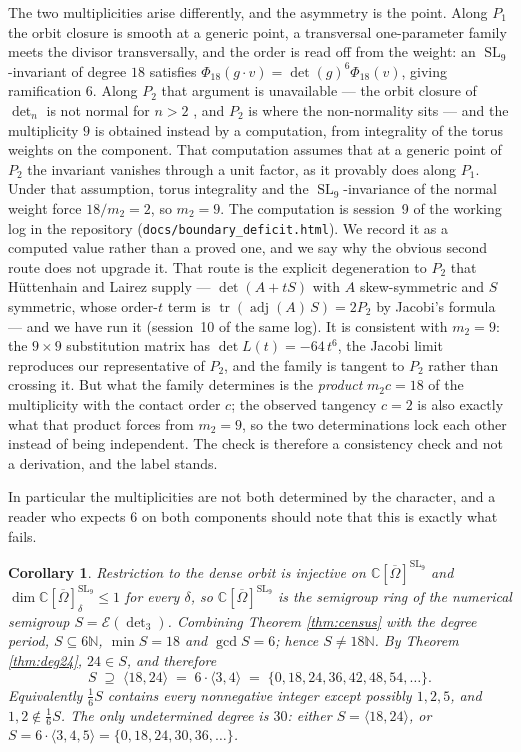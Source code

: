 \documentclass[11pt,reqno]{amsart}
\theoremstyle{plain}
\newtheorem{corollary}[theorem]{Corollary}
\theoremstyle{definition}
\DeclareMathOperator{\SL}{SL}
\DeclareMathOperator{\tr}{tr}
\newcommand{\cO}{\overline{\Omega}}
\newcommand{\bC}{\mathbb{C}}
\newcommand{\bN}{\mathbb{N}}
\begin{document}
The two multiplicities arise differently, and the asymmetry is the point.  Along
$P_1$ the orbit closure is smooth at a generic point, a transversal
one-parameter family meets the divisor transversally, and the order is read off
from the weight: an $\SL_9$-invariant of degree $18$ satisfies
$\Phi_{18}(g\cdot v)=\det(g)^{6}\Phi_{18}(v)$, giving ramification $6$.
Along $P_2$ that argument is unavailable --- the orbit closure of $\det_n$ is
not normal for $n>2$ \cite{KumarCMH}, and $P_2$ is where the non-normality
sits --- and the multiplicity $9$ is obtained instead by a computation, from
integrality of the torus weights on the component.  That computation assumes
that at a generic point of $P_2$ the invariant vanishes through a unit factor,
as it provably does along $P_1$.  Under that assumption, torus integrality and
the $\SL_9$-invariance of the normal weight force $18/m_2=2$, so $m_2=9$.  The
computation is session~9 of the working log in the repository
(\texttt{docs/boundary\_deficit.html}).  We record it as a computed value rather
than a proved one, and we say why the obvious second route does not upgrade it.
That route is the explicit degeneration to $P_2$ that H\"uttenhain and Lairez
supply --- $\det(A+tS)$ with $A$ skew-symmetric and $S$ symmetric, whose
order-$t$ term is $\tr(\operatorname{adj}(A)\,S)=2P_2$ by Jacobi's
formula \cite[\S8.1]{Hue} --- and we have run it (session~10 of the same log).
It is consistent with $m_2=9$: the $9\times9$ substitution matrix has
$\det L(t)=-64\,t^{6}$, the Jacobi limit reproduces our representative of
$P_2$, and the family is tangent to $P_2$ rather than crossing it.  But what
the family determines is the \emph{product} $m_2 c=18$ of the multiplicity with
the contact order $c$; the observed tangency $c=2$ is also exactly what that
product forces from $m_2=9$, so the two determinations lock each other instead
of being independent.  The check is therefore a consistency check and not a
derivation, and the label stands.

In particular the multiplicities are not both
determined by the character, and a reader who expects $6$ on both components
should note that this is exactly what fails.

\begin{corollary}\label{cor:semigroup}
Restriction to the dense orbit is injective on $\bC[\cO]^{\SL_9}$ and
$\dim\bC[\cO]^{\SL_9}_\delta\le1$ for every $\delta$, so
$\bC[\cO]^{\SL_9}$ is the semigroup ring of the numerical semigroup
$S=\mathcal E(\det_3)$.  Combining Theorem \ref{thm:census} with the degree
period, $S\subseteq6\bN$, $\min S=18$ and $\gcd S=6$; hence $S\neq18\bN$.  By
Theorem \ref{thm:deg24}, $24\in S$, and therefore
\[
  S\;\supseteq\;\langle 18,24\rangle\;=\;6\cdot\langle3,4\rangle
  \;=\;\{0,18,24,36,42,48,54,\dots\} .
\]
Equivalently $\tfrac16S$ contains every nonnegative integer except possibly
$1,2,5$, and $1,2\notin\tfrac16S$.  The only undetermined degree is $30$:
either $S=\langle18,24\rangle$, or $S=6\cdot\langle3,4,5\rangle
=\{0,18,24,30,36,\dots\}$.
\end{corollary}
\end{document}
